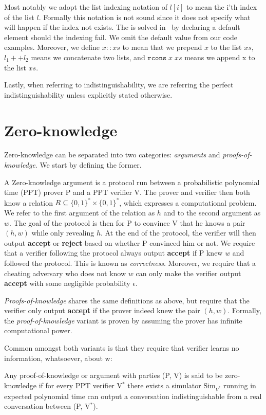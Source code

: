 Most notably we adopt the list indexing notation of $l[i]$ to mean the i'th
index of the list $l$. Formally this notation is not sound since it does not
specify what will happen if the index not exists. The is solved in \easycrypt\
by declaring a default element should the indexing fail. We omit
the default value from our code examples.
Moreover, we define $x::xs$ to mean that we prepend $x$ to the list $xs$,
$l_{1} ++ l_{2}$ means we concatenate two lists, and $\texttt{rcons} \; x \; xs$ means we
append x to the list $xs$.

Lastly, when referring to indistinguishability, we are referring the perfect
indistinguishability unless explicitly stated otherwise.

\section{Zero-knowledge}
\label{sec:background:zero-knowledge}
Zero-knowledge can be separated into two categories: \textit{arguments} and
\textit{proofs-of-knowledge}. We start by defining the former.

A Zero-knowledge argument is a protocol run between a probabilistic polynomial
time (PPT) prover P and a PPT verifier V. The prover and verifier then both
know a relation $R \subseteq \{0,1\}^{*} \times \{0,1\}^*$, which expresses a
computational problem. We refer to the first argument of the relation as $h$ and
to the second argument as $w$.
The goal of the protocol is then for P to convince V that he knows a pair
$(h,w)$ while only revealing $h$. At the end of the protocol, the verifier will
then output \textbf{accept} or \textbf{reject} based on whether P convinced
him or not.
We require that a verifier following the protocol always output
\textbf{accept} if P knew $w$ and followed the protocol.
This is known as \textit{correctness}.
Moreover, we require that a cheating adversary who does not know $w$ can
only make the verifier output \textbf{accept} with some negligible probability $\epsilon$.

\textit{Proofs-of-knowledge} shares the same definitions
as above, but require that the verifier only output \textbf{accept} if the
prover indeed knew the pair $(h,w)$. Formally, the \textit{proof-of-knowledge}
variant is proven by assuming the prover has infinite computational power.


Common amongst both variants is that they require that verifier learns no
information, whatsoever, about w:

\begin{definition}
  \label{def:zk}
  Any proof-of-knowledge or argument with parties (P, V) is said to be
  zero-knowledge if for every PPT verifier V$^{*}$ there exists a
  simulator $\text{Sim}_{V^{*}}$ running in expected polynomial time can output a
  conversation indistinguishable from a real conversation between (P, V$^{*}$).
\end{definition}


